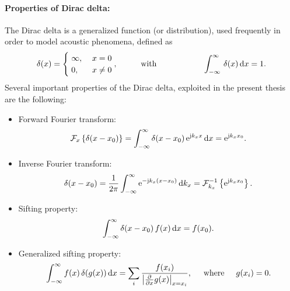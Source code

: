\paragraph{Properties of Dirac delta:}
The Dirac delta is a generalized function (or distribution), used frequently in order to model acoustic phenomena, defined as
\begin{equation}
\delta(x) = 
\begin{cases}
\hspace{1mm} \infty, & \hspace{1mm} x = 0\\
\hspace{1mm} 0, & \hspace{1mm}  x \neq 0
\end{cases},
\hspace{1cm}
\text{with}
\hspace{2cm}
\int_{-\infty}^{\infty} \, \delta(x) \, \td x = 1.
\end{equation}
Several important properties of the Dirac delta, exploited in the present thesis are the following:
\begin{itemize}
\item Forward Fourier transform:
\begin{equation}
\FT[x]{\delta(x-x_0)} = \int_{-\infty}^{\infty} \delta(x-x_0) \, \te^{\ti k_x x} \, \td x =   \te^{\ti k_x x_0}.
\end{equation}
\item Inverse Fourier transform:
\begin{equation}
\delta(x-x_0) = \frac{1}{2\pi} \int_{-\infty}^{\infty} \te^{-\ti k_x (x-x_0)} \, \td k_x =  \IFT[k_x]{ \te^{\ti k_x x_0} }.
\end{equation}
\item Sifting property:
\begin{equation}
\int_{-\infty}^{\infty} \delta(x-x_0) \, f(x) \, \td x = f(x_0).
\end{equation}
\item Generalized sifting property:
\begin{equation}
\int_{-\infty}^{\infty} f(x) \, \delta(g(x)) \, \td x = \sum_{i} \frac{f(x_i)}{\left| \frac{\partial}{\partial x} g(x) \right|_{x = x_i}}, \hspace{5mm} \text{where} \hspace{5mm} g(x_i) = 0.
\end{equation} 
\end{itemize}